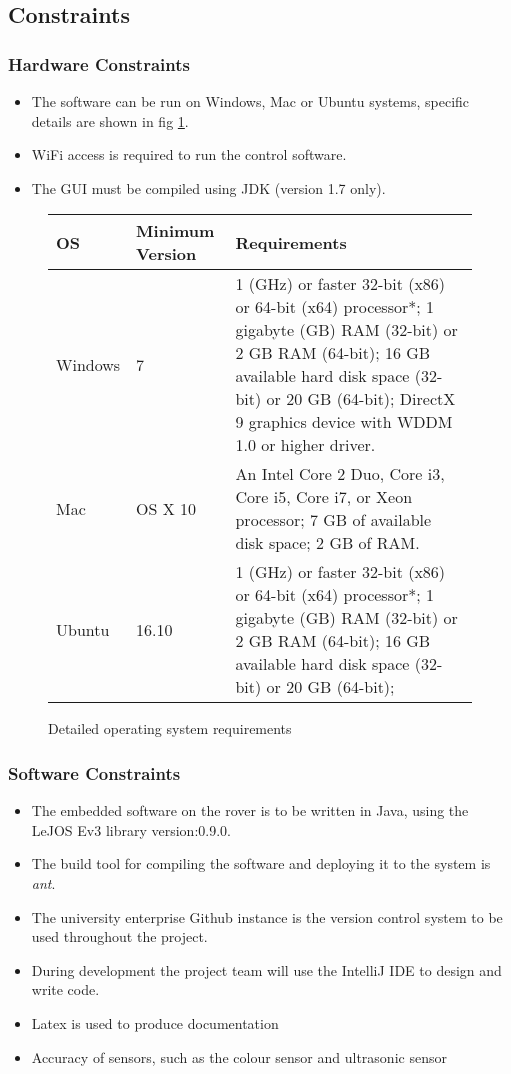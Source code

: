 \subsection{Constraints}
	\subsubsection*{Hardware Constraints}
	\begin{itemize}
	\item The software can be run on Windows, Mac or Ubuntu systems, specific details are shown in fig \ref{fig:tab Os Requirements}. 
	\item  WiFi access is required to run the control software. 
	\item The GUI must be compiled using JDK (version 1.7 only).
	\end{itemize}	

		
	\begin{figure}
		\centering
		\begin{tabular}{|p{2cm}|p{2cm}|p{7cm}|}
			\hline 
			\textbf{OS} &\textbf{Minimum Version} & \textbf{Requirements} \\ 
			\hline 
			Windows & 7 & 1 (GHz) or faster 32-bit (x86) or 64-bit (x64) processor*;
			1 gigabyte (GB) RAM (32-bit) or 2 GB RAM (64-bit);
			16 GB available hard disk space (32-bit) or 20 GB (64-bit);
			DirectX 9 graphics device with WDDM 1.0 or higher driver. \\ 
			\hline 
			Mac & OS X 10 & An Intel Core 2 Duo, Core i3, Core i5, Core i7, or Xeon processor;
			7 GB of available disk space;
			2 GB of RAM. \\ 
			\hline 
			Ubuntu & 16.10 & 1 (GHz) or faster 32-bit (x86) or 64-bit (x64) processor*;
			1 gigabyte (GB) RAM (32-bit) or 2 GB RAM (64-bit);
			16 GB available hard disk space (32-bit) or 20 GB (64-bit); \\
			\hline 
		\end{tabular} 
		\caption{Detailed operating system requirements}
		\label{fig:tab Os Requirements}
	\end{figure}
	
	\subsubsection*{Software Constraints}
	\begin{itemize}
	\item The embedded software on the rover is to be written in Java, using the LeJOS Ev3 library version:0.9.0.
	\item The build tool for compiling the software and deploying it to the system is \textit{ant}.
	\item The university enterprise Github instance is the version control system to be used throughout the project.
	\item During development the project team will use the IntelliJ IDE to design and write code. 
	\item Latex is used to produce documentation
	\item Accuracy of sensors, such as the colour sensor and ultrasonic sensor
	\end{itemize}	



	





